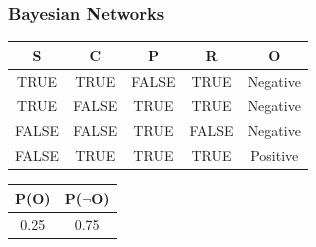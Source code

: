\documentclass[aspectratio=169, 10pt]{beamer}
\begin{document}
\begin{frame}[t]
    \frametitle{Bayesian Networks}

    \begin{table}[]
        \small
        \begin{tabular}{cccc|c}
        \textbf{S} & \textbf{C} & \textbf{P} & \textbf{R} & \textbf{O} \\ \hline
        TRUE       & TRUE       & FALSE      & TRUE       & Negative   \\
        TRUE       & FALSE      & TRUE       & TRUE       & Negative   \\
        FALSE      & FALSE      & TRUE       & FALSE      & Negative   \\
        FALSE      & TRUE       & TRUE       & TRUE       & Positive  
        \end{tabular}
    \end{table}

    \begin{figure}
        \center
    \end{figure}

    \begin{table}[]
        \small
        \begin{tabular}{cc}
        P(O) & P($\neg$O) \\ \hline
        0.25 & 0.75 \\
        \end{tabular}
    \end{table}


\end{frame}
\end{document}
